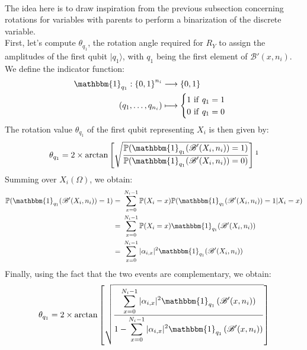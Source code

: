 \\[5pt]
The idea here is to draw inspiration from the previous subsection concerning rotations for variables with parents to perform a binarization of the discrete variable.
\\[5pt]
First, let's compute $\theta_{q_1}$, the rotation angle required for $R_Y$ to assign the amplitudes of the first qubit $|q_1\rangle$, with $q_1$ being the first element of $\mathscr{B}'(x,n_i)$. We define the indicator function:
\begin{align*}
    \mathbbm{1}_{q_1} : {\{0,1\}}^{n_i} &\longrightarrow \{0,1\} \\
    (q_1, \hdots ,q_{n_i}) &\longmapsto
 \begin{cases}
 1 \ \mathrm{if} \ q_1 = 1 \\
 0 \ \mathrm{if} \ q_1 = 0 
 \end{cases}
\end{align*}
The rotation value $\theta_{q_1}$ of the first qubit representing $X_i$ is then given by:
\begin{align*}
    \theta_{q_1} = 2\times\mathrm{arctan}\left[\sqrt{\frac{\displaystyle \mathbb{P}(\mathbbm{1}_{q_1}(\mathscr{B}'(X_i,n_i))=1)}{\displaystyle \mathbb{P}(\mathbbm{1}_{q_1}(\mathscr{B}'(X_i,n_i))=0)}}\right] \footnotemark
\end{align*}
Summing over $X_i(\Omega)$, we obtain:
\begin{align*}
    \mathbb{P}(\mathbbm{1}_{q_1}(\mathscr{B}'(X_i,n_i))=1) =&\ \sum_{x=0}^{N_i-1}\mathbb{P}(X_i=x)\mathbb{P}(\mathbbm{1}_{q_1}(\mathscr{B}'(X_i,n_i))=1|X_i=x) \\
    =&\ \sum_{x=0}^{N_i-1}\mathbb{P}(X_i=x)\mathbbm{1}_{q_1}(\mathscr{B}'(X_i,n_i)) \\
    =&\ \sum_{x=0}^{N_i-1}|\alpha_{i,x}|^2\mathbbm{1}_{q_1}(\mathscr{B}'(X_i,n_i))
\end{align*}
Finally, using the fact that the two events are complementary, we obtain: 
\begin{align*}
    \theta_{q_1} = 2\times\mathrm{arctan}\left[\sqrt{\frac{\displaystyle \sum_{x=0}^{N_i-1}|\alpha_{i,x}|^2\mathbbm{1}_{q_1}\left(\mathscr{B}'(x,n_i)\right)}{\displaystyle 1-\sum_{x=0}^{N_i-1}|\alpha_{i,x}|^2\mathbbm{1}_{q_1}\left(\mathscr{B}'(x,n_i)\right)}}\right]
\end{align*}
\vspace{5pt}
